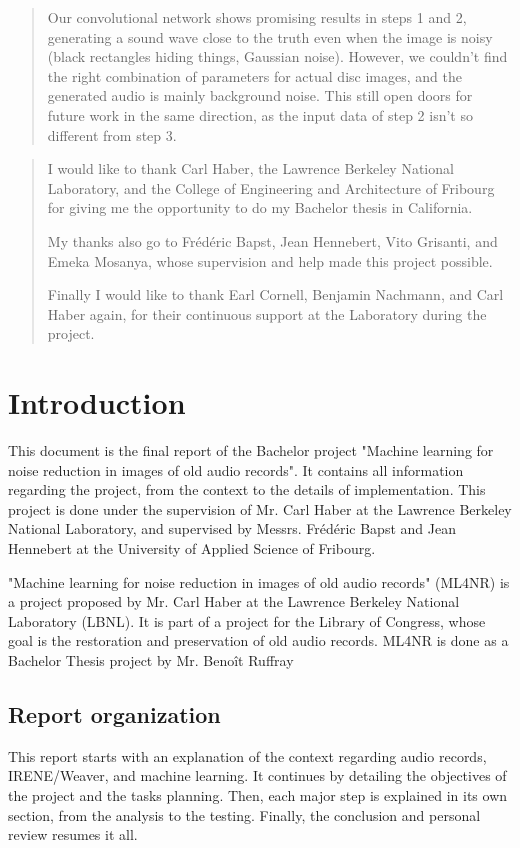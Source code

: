 \documentclass[12pt, twoside]{article}
\begin{document}
\begin{abstract}
	Our convolutional network shows promising results in steps 1 and 2, generating a sound wave close to the truth even when the image is noisy (black rectangles hiding things, Gaussian noise). However, we couldn't find the right combination of parameters for actual disc images, and the generated audio is mainly background noise. This still open doors for future work in the same direction, as the input data of step 2 isn't so different from step 3. 
	
\end{abstract}
\renewcommand{\abstractname}{Acknowledgements}
\begin{abstract}
	I would like to thank Carl Haber, the Lawrence Berkeley National Laboratory, and the College of Engineering and Architecture of Fribourg for giving me the opportunity to do my Bachelor thesis in California.
	
	My thanks also go to Frédéric Bapst, Jean Hennebert, Vito Grisanti, and Emeka Mosanya, whose supervision and help made this project possible.
	
	Finally I would like to thank Earl Cornell, Benjamin Nachmann, and Carl Haber again, for their continuous support at the Laboratory during the project.
\end{abstract}

\section{Introduction}
This document is the final report of the Bachelor project "Machine learning for noise reduction in images of old audio records". It contains all information regarding the project, from the context to the details of implementation. This project is done under the supervision of Mr. Carl Haber at the Lawrence Berkeley National Laboratory, and supervised by Messrs. Frédéric Bapst and Jean Hennebert at the University of Applied Science of Fribourg.

"Machine learning for noise reduction in images of old audio records" (ML4NR) is a project proposed by Mr. Carl Haber at the Lawrence Berkeley National Laboratory (LBNL). It is part of a project for the Library of Congress, whose goal is the restoration and preservation of old audio records.
ML4NR is done as a Bachelor Thesis project by Mr. Benoît Ruffray
\subsection{Report organization}
This report starts with an explanation of the context regarding audio records, IRENE/Weaver, and machine learning. It continues by detailing the objectives of the project and the tasks planning. Then, each major step is explained in its own section, from the analysis to the testing. Finally, the conclusion and personal review resumes it all.
\end{document}
